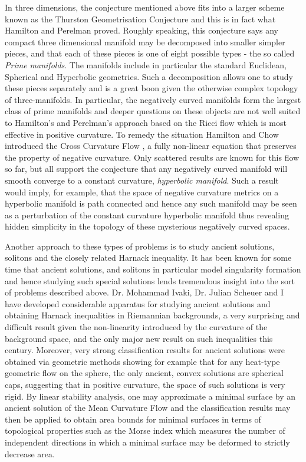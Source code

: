 \documentclass[12pt]{amsart}
\begin{document}
In three dimensions, the \poincare{} conjecture mentioned above fits into a larger scheme known as the Thurston Geometrisation Conjecture and this is in fact what Hamilton and Perelman proved. Roughly speaking, this conjecture says any compact three dimensional manifold may be decomposed into smaller simpler pieces, and that each of these pieces is one of eight possible types - the so called \emph{Prime manifolds}. The manifolds include in particular the standard Euclidean, Spherical and Hyperbolic geometries. Such a decomposition allows one to study these pieces separately and is a great boon given the otherwise complex topology of three-manifolds. In particular, the negatively curved manifolds form the largest class of prime manifolds and deeper questions on these objects are not well suited to Hamilton's and Perelman's approach based on the Ricci flow which is most effective in positive curvature. To remedy the situation Hamilton and Chow introduced the Cross Curvature Flow \cite{MR2055396}, a fully non-linear equation that preserves the property of negative curvature. Only scattered results are known for this flow so far, but all support the conjecture that any negatively curved manifold will smooth converge to a constant curvature, \emph{hyperbolic manifold}. Such a result would imply, for example, that the space of negative curvature metrics on a hyperbolic manifold is path connected and hence any such manifold may be seen as a perturbation of the constant curvature hyperbolic manifold thus revealing hidden simplicity in the topology of these mysterious negatively curved spaces.

Another approach to these types of problems is to study ancient solutions, solitons and the closely related Harnack inequality. It has been known for some time that ancient solutions, and solitons in particular model singularity formation and hence studying such special solutions lends tremendous insight into the sort of problems described above. Dr. Mohammad Ivaki, Dr. Julian Scheuer and I have developed considerable apparatus \cite{BIS4,2016arXiv160401694B,2015arXiv150802821B,2015arXiv151203374B} for studying ancient solutions and obtaining Harnack inequalities in Riemannian backgrounds, a very surprising and difficult result given the non-linearity introduced by the curvature of the background space, and the only major new result on such inequalities this century. Moreover, very strong classification results for ancient solutions were obtained via geometric methods showing for example that for any heat-type geometric flow on the sphere, the only ancient, convex solutions are spherical caps, suggesting that in positive curvature, the space of such solutions is very rigid. By linear stability analysis, one may approximate a minimal surface by an ancient solution of the Mean Curvature Flow and the classification results may then be applied to obtain area bounds for minimal surfaces in terms of topological properties such as the Morse index which measures the number of independent directions in which a minimal surface may be deformed to strictly decrease area.
\end{document}
